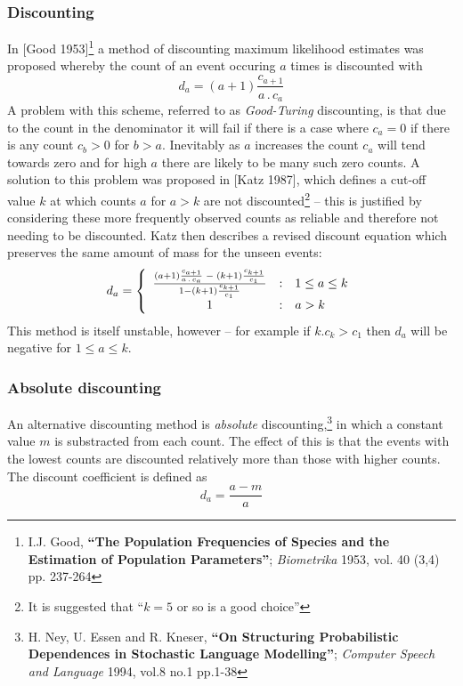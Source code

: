 \subsubsection{Discounting}
In [Good 1953]\footnote{I.J. Good, \textbf{``The Population Frequencies
of Species and the Estimation of Population Parameters''};
\textit{Biometrika} 1953, vol. 40 (3,4) pp. 237-264}
a method of discounting maximum likelihood estimates was proposed
whereby the count of an event occuring $a$ times is discounted with
\begin{equation}
d_a = (a+1) \frac{c_{a+1}}{a\,.\,c_a}
\end{equation}
A problem with this scheme, referred to as {\it Good-Turing} discounting,
is that due to the count in the denominator it will fail if there is a
case where $c_a = 0$ if there is any count $c_b > 0$ for
$b>a$. Inevitably as $a$ increases the count $c_a$ will tend towards
zero and for high $a$ there are likely to be many such zero counts. A
solution to this problem was proposed in
[Katz 1987], which defines a cut-off value $k$ at which counts $a$
for $a > k$ are not discounted\footnote{It is suggested that ``$k=5$
or so is a good choice''} -- this is justified by
considering these more frequently observed counts as reliable and
therefore not needing to be discounted. Katz then describes a revised
discount equation which preserves the same amount of mass for the
unseen events:
\begin{equation}
d_a = \left\{ \begin{array}{c@{\quad:\quad}l}
  \frac{(a+1) \frac{c_{a+1}}{a\,.\,c_a} \;-\; (k+1)\frac{c_{k+1}}{c_1}}
      {1 - (k+1)\frac{c_{k+1}}{c_1}}
  & 1 \le a \le k\\
1 & a>k
\end{array}\right.
\end{equation}
This method is itself unstable, however -- for example if $k.c_k > c_1$
then $d_a$ will be negative for $1 \le a \le k$.

\subsubsection{Absolute discounting}
An alternative discounting method is {\it absolute}
discounting,\footnote{H. Ney, U. Essen and R. Kneser, \textbf{``On
Structuring Probabilistic Dependences in Stochastic Language
Modelling''}; \textit{Computer Speech and Language} 1994, vol.8 no.1
pp.1-38} in which a constant value $m$ is substracted from each
count. The effect of this is that the events with the lowest counts
are discounted relatively more than those with higher counts. The
discount coefficient is defined as
\begin{equation}
d_a = \frac{a-m}{a}
\end{equation}

